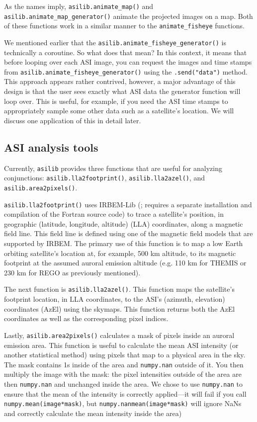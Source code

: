 \documentclass[utf8]{FrontiersinHarvard} %
\begin{document}
As the names imply, \verb|asilib.animate_map()| and \verb|asilib.animate_map_generator()| animate the projected images on a map. Both of these functions work in a similar manner to the \verb|animate_fisheye| functions. 

We mentioned earlier that the \verb|asilib.animate_fisheye_generator()| is technically a coroutine. So what does that mean? In this context, it means that before looping over each ASI image, you can request the images and time stamps from \verb|asilib.animate_fisheye_generator()| using the \verb|.send("data")| method. This approach appears rather contrived, however, a major advantage of this design is that the user sees exactly what ASI data the generator function will loop over. This is useful, for example, if you need the ASI time stamps to appropriately sample some other data such as a satellite's location. We will discuss one application of this in detail later.

\subsection{ASI analysis tools}
Currently, \verb|asilib| provides three functions that are useful for analyzing conjunctions: \verb|asilib.lla2footprint()|, \verb|asilib.lla2azel()|, and \verb|asilib.area2pixels()|.

\verb|asilib.lla2footprint()| uses IRBEM-Lib (\cite{irbem}; requires a separate installation and compilation of the Fortran source code) to trace a satellite's position, in geographic (latitude, longitude, altitude) (LLA) coordinates, along a magnetic field line. This field line is defined using one of the magnetic field models that are supported by IRBEM. The primary use of this function is to map a low Earth orbiting satellite's location at, for example, 500 km altitude, to its magnetic footprint at the assumed auroral emission altitude (e.g. 110 km for THEMIS or 230 km for REGO as previously mentioned).

The next function is \verb|asilib.lla2azel()|. This function maps the satellite's footprint location, in LLA coordinates, to the ASI's (azimuth, elevation) coordinates (AzEl) using the skymaps. This function returns both the AzEl coordinates as well as the corresponding pixel indices.

Lastly, \verb|asilib.area2pixels()| calculates a mask of pixels inside an auroral emission area. This function is useful to calculate the mean ASI intensity (or another statistical method) using pixels that map to a physical area in the sky. The mask contains 1s inside of the area and \verb|numpy.nan| outside of it. You then multiply the image with the mask: the pixel intensities outside of the area are then \verb|numpy.nan| and unchanged inside the area. We chose to use \verb|numpy.nan| to ensure that the mean of the intensity is correctly applied---it will fail if you call \verb|numpy.mean(image*mask)|, but \verb|numpy.nanmean(image*mask)| will ignore NaNs and correctly calculate the mean intensity inside the area)
\end{document}
